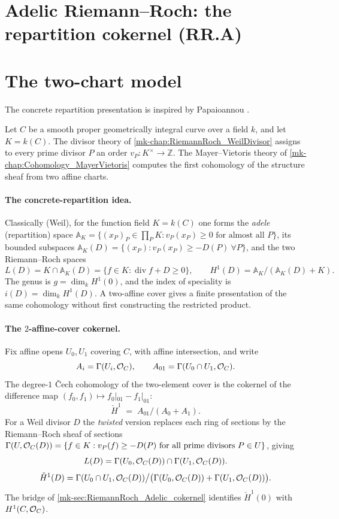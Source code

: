 \section{Adelic Riemann--Roch: the repartition cokernel (RR.A)}
\label{mk-chap:RiemannRoch_Adelic}

\section{The two-chart model}
\label{mk-sec:RiemannRoch_Adelic_intro}
The concrete repartition presentation is inspired by Papaioannou \cite{papaioannou-rr}.

Let \(C\) be a smooth proper geometrically integral curve over a field
\(k\), and let \(K=k(C)\).  The divisor theory of
\ref{mk-chap:RiemannRoch_WeilDivisor} assigns to every prime divisor \(P\)
an order \(v_P\colon K^\times\to\mathbb Z\).  The Mayer--Vietoris theory
of \ref{mk-chap:Cohomology_MayerVietoris} computes the first cohomology of
the structure sheaf from two affine charts.

\paragraph{The concrete-repartition idea.}
Classically (Weil), for the function field \(K = k(C)\) one forms the
\emph{adele} (repartition) space
\(\mathbb{A}_K = \{(x_P)_P \in \prod_P K : v_P(x_P) \ge 0 \text{ for
almost all } P\}\), its bounded subspaces
\(\mathbb{A}_K(D) = \{(x_P) : v_P(x_P) \ge -D(P)\ \forall P\}\), and the
two Riemann--Roch spaces
\[
  L(D) = K \cap \mathbb{A}_K(D)
        = \{ f \in K : \operatorname{div} f + D \ge 0\},
  \qquad
  H^1(D) = \mathbb{A}_K / (\mathbb{A}_K(D) + K).
\]
The genus is \(g=\dim_k H^1(0)\), and the index of speciality is
\(i(D)=\dim_k H^1(D)\).  A two-affine cover gives a finite presentation
of the same cohomology without first constructing the restricted product.

\paragraph{The \(2\)-affine-cover cokernel.}
Fix affine opens \(U_0,U_1\) covering \(C\), with affine intersection, and
write
\[
  A_i = \Gamma(U_i, \mathcal{O}_{C}), \qquad
  A_{01} = \Gamma(U_0 \cap U_1, \mathcal{O}_{C}).
\]
The degree-\(1\) Čech cohomology of the two-element cover is the cokernel
of the difference map \((f_0, f_1) \mapsto f_0|_{01} - f_1|_{01}\):
\[
  \check{H}^1 \;=\; A_{01} \big/ (A_0 + A_1).
\]
For a Weil divisor \(D\) the \emph{twisted} version replaces each ring of
sections by the Riemann--Roch sheaf of sections
\(\Gamma(U, \mathcal{O}_{C}(D)) = \{ f \in K : v_P(f) \ge -D(P) \text{ for all
prime divisors } P \in U\}\), giving
\[
  L(D) = \Gamma(U_0, \mathcal{O}_{C}(D)) \cap \Gamma(U_1, \mathcal{O}_{C}(D)).
\]
\[
  \check{H}^1(D) = \Gamma(U_0 \cap U_1, \mathcal{O}_{C}(D)) \big/
    \bigl(\Gamma(U_0, \mathcal{O}_{C}(D)) + \Gamma(U_1, \mathcal{O}_{C}(D))\bigr).
\]
The bridge of \ref{mk-sec:RiemannRoch_Adelic_cokernel} identifies
\(\check H^1(0)\) with \(H^1(C,\mathcal{O}_{C})\).

